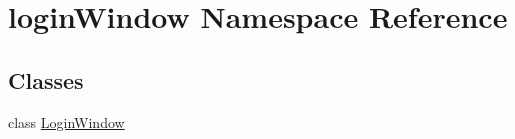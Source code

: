\hypertarget{namespacelogin_window}{}\section{login\+Window Namespace Reference}
\label{namespacelogin_window}
\subsection*{Classes}
\begin{DoxyCompactItemize}
\item 
class \mbox{\hyperlink{classlogin_window_1_1_login_window}{Login\+Window}}
\end{DoxyCompactItemize}
